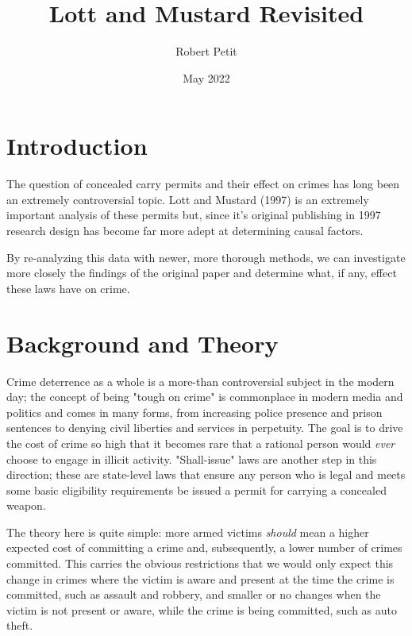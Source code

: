 \documentclass{article}
\title{Lott and Mustard Revisited}
\author{Robert Petit}
\date{May 2022}
\begin{document}
\maketitle

\section{Introduction}

The question of concealed carry permits and their effect on crimes has long been an extremely controversial topic. Lott and Mustard (1997) is an extremely important analysis of these permits but, since it's original publishing in 1997 research design has become far more adept at determining causal factors. 

By re-analyzing this data with newer, more thorough methods, we can investigate more closely the findings of the original paper and determine what, if any, effect these laws have on crime.

\section{Background and Theory}

Crime deterrence as a whole is a more-than controversial subject in the modern day; the concept of being "tough on crime" is commonplace in modern media and politics and comes in many forms, from increasing police presence and prison sentences to denying civil liberties and services in perpetuity. The goal is to drive the cost of crime so high that it becomes rare that a rational person would \emph{ever} choose to engage in illicit activity. "Shall-issue" laws are another step in this direction; these are state-level laws that ensure any person who is legal and meets some basic eligibility requirements be issued a permit for carrying a concealed weapon.

The theory here is quite simple: more armed victims \emph{should} mean a higher expected cost of committing a crime and, subsequently, a lower number of crimes committed. This carries the obvious restrictions that we would only expect this change in crimes where the victim is aware and present at the time the crime is committed, such as assault and robbery, and smaller or no changes when the victim is not present or aware, while the crime is being committed, such as auto theft. 


\end{document}
